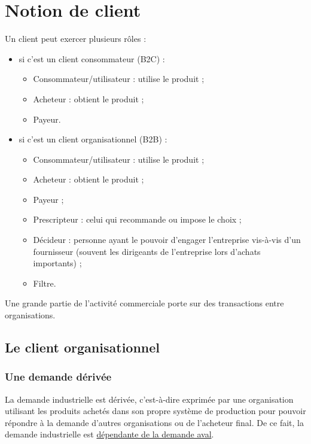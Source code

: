 	\section{Notion de client}


	Un client peut exercer plusieurs rôles :
	
	\begin{itemize}
		\item si c'est un client consommateur (B2C) :
		\begin{itemize}
			\item Consommateur/utilisateur : utilise le produit ;
			\item Acheteur : obtient le produit ;
			\item Payeur.
		\end{itemize}
		
		\item si c'est un client organisationnel (B2B) :
		
		\begin{itemize}
			\item Consommateur/utilisateur : utilise le produit ;
			\item Acheteur : obtient le produit ;
			\item Payeur ;
			\item Prescripteur : celui qui recommande ou impose le choix ;
			\item Décideur : personne ayant le pouvoir d'engager l'entreprise vis-à-vis d'un fournisseur (souvent les dirigeants de l'entreprise lors d'achats importants) ;
			\item Filtre.
		\end{itemize}
	\end{itemize}
	
	Une grande partie de l'activité commerciale porte sur des transactions entre organisations.
	
		\subsection{Le client organisationnel}

		\subsubsection{Une demande dérivée}

		La demande industrielle est dérivée, c'est-à-dire exprimée par une organisation utilisant les produits achetés dans son propre système de production pour pouvoir répondre à la demande d'autres organisations ou de l'acheteur final. De ce fait, la demande industrielle est \underline{dépendante de la demande aval}.

